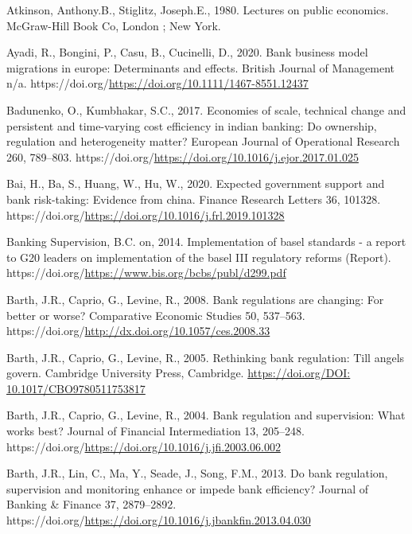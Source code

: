 \documentclass[
  12pt,
  a4paper,
]{scrreprt}
\newlength{\cslhangindent}
\newenvironment{CSLReferences}[2] %
 {\begin{list}{}{%
  \setlength{\itemindent}{0pt}
  \setlength{\leftmargin}{0pt}
  \setlength{\parsep}{0pt}
  \ifodd #1
   \setlength{\leftmargin}{\cslhangindent}
   \setlength{\itemindent}{-1\cslhangindent}
  \fi
  \setlength{\itemsep}{#2\baselineskip}}}
 {\end{list}}
\begin{document}
\begin{CSLReferences}{1}{0}
Atkinson, Anthony.B., Stiglitz, Joseph.E., 1980. Lectures on public
economics. McGraw-Hill Book Co, London ; New York.

Ayadi, R., Bongini, P., Casu, B., Cucinelli, D., 2020. Bank business
model migrations in europe: Determinants and effects. British Journal of
Management n/a.
https://doi.org/\url{https://doi.org/10.1111/1467-8551.12437}

Badunenko, O., Kumbhakar, S.C., 2017. Economies of scale, technical
change and persistent and time-varying cost efficiency in indian
banking: Do ownership, regulation and heterogeneity matter? European
Journal of Operational Research 260, 789--803.
https://doi.org/\url{https://doi.org/10.1016/j.ejor.2017.01.025}

Bai, H., Ba, S., Huang, W., Hu, W., 2020. Expected government support
and bank risk-taking: Evidence from china. Finance Research Letters 36,
101328. https://doi.org/\url{https://doi.org/10.1016/j.frl.2019.101328}

Banking Supervision, B.C. on, 2014. Implementation of basel standards -
a report to G20 leaders on implementation of the basel III regulatory
reforms (Report).
https://doi.org/\url{https://www.bis.org/bcbs/publ/d299.pdf}

Barth, J.R., Caprio, G., Levine, R., 2008. Bank regulations are
changing: For better or worse? Comparative Economic Studies 50,
537--563. https://doi.org/\url{http://dx.doi.org/10.1057/ces.2008.33}

Barth, J.R., Caprio, G., Levine, R., 2005. Rethinking bank regulation:
Till angels govern. Cambridge University Press, Cambridge.
\href{https://doi.org/DOI:\%2010.1017/CBO9780511753817}{https://doi.org/DOI:
10.1017/CBO9780511753817}

Barth, J.R., Caprio, G., Levine, R., 2004. Bank regulation and
supervision: What works best? Journal of Financial Intermediation 13,
205--248.
https://doi.org/\url{https://doi.org/10.1016/j.jfi.2003.06.002}

Barth, J.R., Lin, C., Ma, Y., Seade, J., Song, F.M., 2013. Do bank
regulation, supervision and monitoring enhance or impede bank
efficiency? Journal of Banking \& Finance 37, 2879--2892.
https://doi.org/\url{https://doi.org/10.1016/j.jbankfin.2013.04.030}


\end{CSLReferences}
\end{document}
